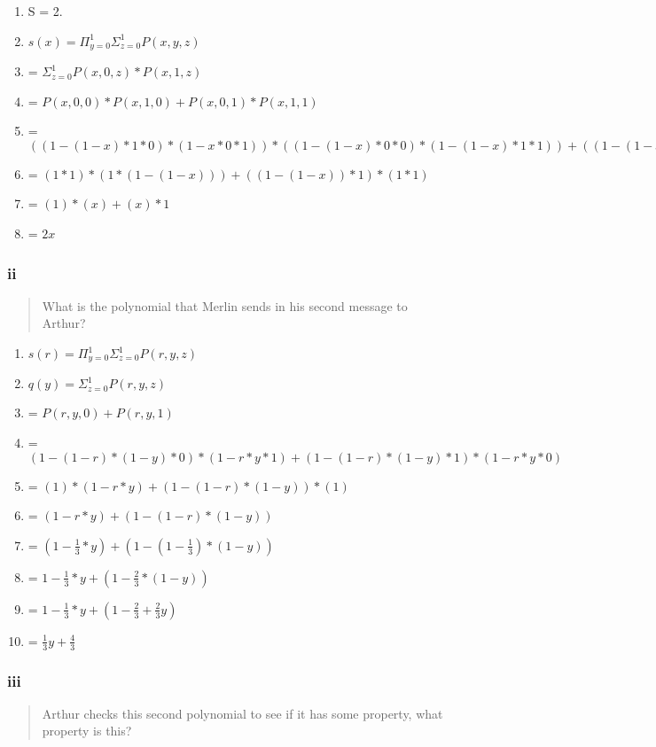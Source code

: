 \documentclass{article}
\begin{document}
\begin{enumerate}[label=]
\item S = 2.
\item $s(x) = \Pi_{y=0}^1 \Sigma_{z=0}^1 P(x,y,z)$
\item = $\Sigma_{z=0}^1 P(x,0,z) * P(x,1,z)$
\item = $P(x,0,0) * P(x,1,0) + P(x,0,1) * P(x,1,1)$
\item = $((1-(1-x)*1*0) * (1-x*0*1)) * ((1-(1-x)*0*0) * (1-(1-x)*1*1)) + ((1-(1-x)*1*1) * (1-x*0*0)) * ((1-(1-x)*0*1) * (1-(1-x)*1*0))$
\item = $(1*1)*(1*(1-(1-x))) + ((1-(1-x))*1)*(1*1)$
\item = $(1)*(x) + (x)*1$
\item = $2x$
\end{enumerate}

\subsubsection{ii}
\begin{quote}
What is the polynomial that Merlin sends in his second message to Arthur? 
\end{quote}

\begin{enumerate}[label=]
\item $s(r) = \Pi_{y=0}^1 \Sigma_{z=0}^1 P(r,y,z)$
\item $q(y) = \Sigma_{z=0}^1 P(r,y,z)$
\item = $P(r,y,0) + P(r,y,1)$
\item = $(1-(1-r)*(1-y)*0) * (1-r*y*1) + (1-(1-r)*(1-y)*1) * (1-r*y*0)$
\item = $(1)*(1-r*y) + (1-(1-r)*(1-y))*(1)$
\item = $(1-r*y) + (1-(1-r)*(1-y))$
\item = $(1-\frac13*y) + (1-(1-\frac13)*(1-y))$
\item = $1-\frac13*y + (1-\frac23*(1-y))$
\item = $1-\frac13*y + (1-\frac23+\frac23y)$
\item = $\frac13y + \frac43$
\end{enumerate}

\subsubsection{iii}
\begin{quote}
Arthur  checks  this  second  polynomial  to  see  if  it  has  some  property,  what property is this?
\end{quote}
\end{document}
